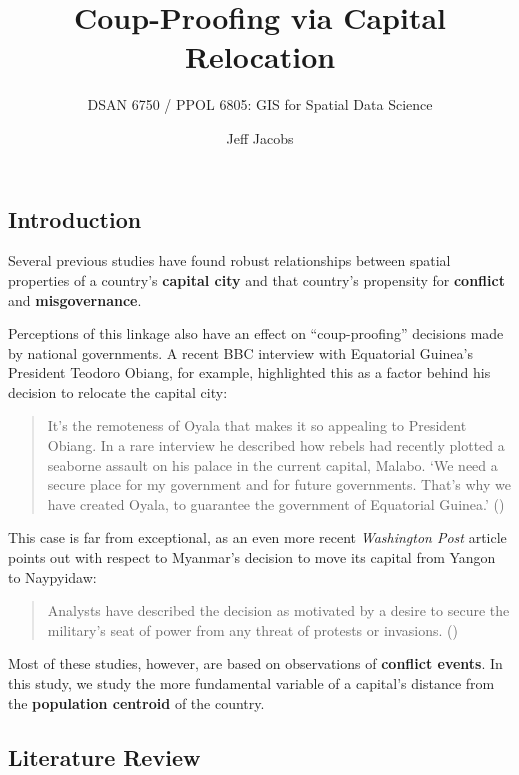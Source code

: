 \documentclass[
  letterpaper,
  DIV=11,
  numbers=noendperiod]{scrartcl}
\title{Coup-Proofing via Capital Relocation}
\subtitle{DSAN 6750 / PPOL 6805: GIS for Spatial Data Science}
\author{Jeff Jacobs}
\date{}
\begin{document}
\maketitle


\subsection{Introduction}\label{introduction}

Several previous studies have found robust relationships between spatial
properties of a country's \textbf{capital city} and that country's
propensity for \textbf{conflict} and \textbf{misgovernance}.

Perceptions of this linkage also have an effect on ``coup-proofing''
decisions made by national governments. A recent BBC interview with
Equatorial Guinea's President Teodoro Obiang, for example, highlighted
this as a factor behind his decision to relocate the capital city:

\begin{quote}
It's the remoteness of Oyala that makes it so appealing to President
Obiang. In a rare interview he described how rebels had recently plotted
a seaborne assault on his palace in the current capital, Malabo. `We
need a secure place for my government and for future governments. That's
why we have created Oyala, to guarantee the government of Equatorial
Guinea.' ()
\end{quote}

This case is far from exceptional, as an even more recent
\emph{Washington Post} article points out with respect to Myanmar's
decision to move its capital from Yangon to Naypyidaw:

\begin{quote}
Analysts have described the decision as motivated by a desire to secure
the military's seat of power from any threat of protests or invasions.
()
\end{quote}

Most of these studies, however, are based on observations of
\textbf{conflict events}. In this study, we study the more fundamental
variable of a capital's distance from the \textbf{population centroid}
of the country.

\subsection{Literature Review}\label{literature-review}
\end{document}
